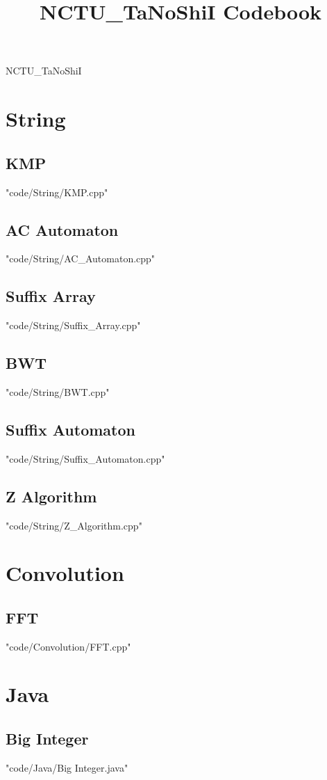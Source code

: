 \documentclass [landscape,8pt,a4paper,twocolumn]{article}
\title {NCTU\_TaNoShiI Codebook}
\begin{document}
\thispagestyle{fancy}
{ \Huge NCTU\_TaNoShiI}
\tableofcontents

\section{String}
\subsection{KMP}
 {"code/String/KMP.cpp"}
\subsection{AC Automaton}
 {"code/String/AC_Automaton.cpp"}
\subsection{Suffix Array}
 {"code/String/Suffix_Array.cpp"}
\subsection{BWT}
 {"code/String/BWT.cpp"}
\subsection{Suffix Automaton}
 {"code/String/Suffix_Automaton.cpp"}
\subsection{Z Algorithm}
 {"code/String/Z_Algorithm.cpp"}
\section{Convolution}
\subsection{FFT}
 {"code/Convolution/FFT.cpp"}
\section{Java}
\subsection{Big Integer}
 {"code/Java/Big Integer.java"}
\end{document}
